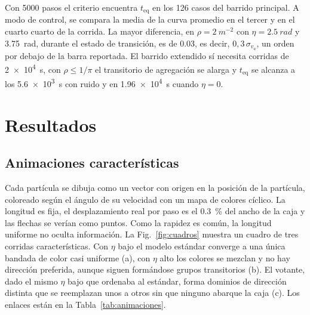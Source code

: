 \documentclass[10pt,a4paper]{article}
\newcommand{\va}{\ensuremath{v_a}}
\newcommand{\teq}{\ensuremath{t_{\mathrm{eq}}}}
\begin{document}
Con \num{5000} pasos el criterio encuentra \teq{} en los \num{126} casos del barrido principal. A modo de control, se compara la media de la curva promedio en el tercer y en el cuarto cuarto de la corrida. La mayor diferencia, en $\rho = \SI{2}{m^{-2}}$ con $\eta = \SI{2.5}{rad}$ y \SI{3.75}{rad}, durante el estado de transición, es de \num{0.03}, es decir, $0{,}3\,\sigma_{\va}$, un orden por debajo de la barra reportada.
El barrido extendido sí necesita corridas de \SI{2e4}{s}, con $\rho \le 1/\pi$ el transitorio de agregación se alarga y \teq{} se alcanza a los \SI{5.6e3}{s} con ruido y en \SI{1.96e4}{s} cuando $\eta = 0$.


\section{Resultados}
\label{sec:resultados}

\subsection{Animaciones características}

Cada partícula se dibuja como un vector con origen en la posición de la partícula, coloreado según el ángulo de su velocidad con un mapa de colores cíclico. La longitud es fija, el desplazamiento real por paso es el \SI{0.3}{\percent} del ancho de la caja y las flechas se verían como puntos. Como la rapidez es común, la longitud uniforme no oculta información.
La Fig.~\ref{fig:cuadros} muestra un cuadro de tres corridas características. Con $\eta$ bajo el modelo estándar converge a una única bandada de color casi uniforme (a), con $\eta$ alto los colores se mezclan y no hay dirección preferida, aunque siguen formándose grupos transitorios (b).
El votante, dado el mismo $\eta$ bajo que ordenaba al estándar, forma dominios de dirección distinta que se reemplazan unos a otros sin que ninguno abarque la caja (c). Los enlaces están en la Tabla~\ref{tab:animaciones}.
\end{document}
